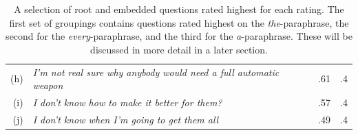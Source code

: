 \documentclass[12pt,letterpaper,table,svgnames,dvipsnames]{article}
\begin{document}
\begin{table}[h!]
\begin{tabular}{rlcc}
        \midrule
        (h) & \emph{I’m not real sure why anybody would need a full automatic weapon} & .61 & .4\\
        (i) & \emph{I don’t know how to make it better for them?} & .57 & .4\\
        (j) & \emph{I don’t know when I’m going to get them all} & .49 & .4 \\
        \bottomrule
    \end{tabular}
    \caption{A selection of root and embedded questions rated highest for each rating. The first set of groupings contains questions rated highest on the \emph{the}-paraphrase, the second for the \emph{every}-paraphrase, and the third for the \emph{a}-paraphrase. These will be discussed in more detail in a later section.}
    \label{tab:e1-qualitative}
\end{table}

 

\end{document}
